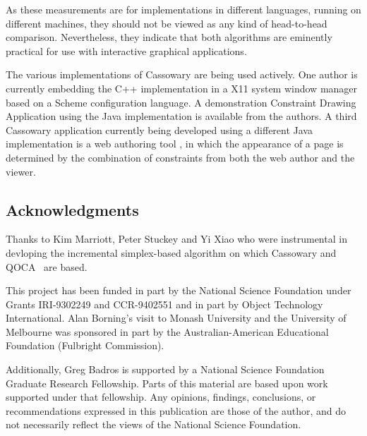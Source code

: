 \documentclass{article}
\begin{document}
As these measurements are for implementations in different languages,
running on different machines, they should not be viewed as any kind of
head-to-head comparison.  Nevertheless, they indicate that both
algorithms are eminently practical for use with interactive graphical
applications.

The various implementations of Cassowary are being used actively.
One author is currently embedding the C++ implementation in a X11 system
window manager based on a Scheme configuration language. A demonstration
Constraint Drawing Application using the Java implementation is
available from the authors.  A third Cassowary application currently
being developed using a different Java implementation is a web authoring
tool \cite{borning-multimedia-97}, in which the appearance of a page is
determined by the combination of constraints from both the web author
and the viewer.

\subsection*{Acknowledgments}

Thanks to Kim Marriott, Peter Stuckey and Yi Xiao who were instrumental
in devloping the incremental simplex-based algorithm on which Cassowary
and QOCA~\cite{borning-simplex-tr} are based.

This project has been funded in part by the National Science Foundation
under Grants \mbox{IRI-9302249} and \mbox{CCR-9402551} and in part by Object
Technology International.  Alan Borning's visit to Monash University and
the University of Melbourne was sponsored in part by the
Australian-American Educational Foundation (Fulbright Commission).

Additionally, Greg Badros is supported by a National Science Foundation
Graduate Research Fellowship.  Parts of this material are based upon
work supported under that fellowship.  Any opinions, findings,
conclusions, or recommendations expressed in this publication are those
of the author, and do not necessarily reflect the views of the National
Science Foundation.



\end{document}
